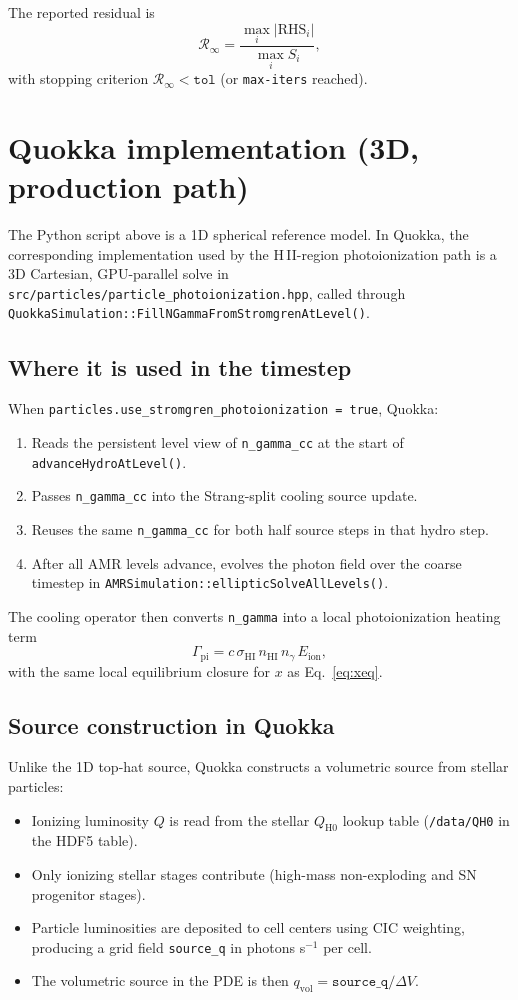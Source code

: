 \documentclass[11pt]{article}
\begin{document}
The reported residual is
\begin{equation}
\mathcal{R}_{\infty} = \frac{\max_i |\mathrm{RHS}_i|}{\max_i S_i},
\end{equation}
with stopping criterion $\mathcal{R}_{\infty}<\texttt{tol}$ (or \texttt{max-iters} reached).

\section{Quokka implementation (3D, production path)}
The Python script above is a 1D spherical reference model. In Quokka, the corresponding implementation used by the H\,II-region photoionization path is a 3D Cartesian, GPU-parallel solve in
\texttt{src/particles/particle\_photoionization.hpp}, called through
\texttt{QuokkaSimulation::FillNGammaFromStromgrenAtLevel()}.

\subsection*{Where it is used in the timestep}
When \texttt{particles.use\_stromgren\_photoionization = true}, Quokka:
\begin{enumerate}
\item Reads the persistent level view of \texttt{n\_gamma\_cc} at the start of \texttt{advanceHydroAtLevel()}.
\item Passes \texttt{n\_gamma\_cc} into the Strang-split cooling source update.
\item Reuses the same \texttt{n\_gamma\_cc} for both half source steps in that hydro step.
\item After all AMR levels advance, evolves the photon field over the coarse timestep in
\texttt{AMRSimulation::ellipticSolveAllLevels()}.
\end{enumerate}
The cooling operator then converts \texttt{n\_gamma} into a local photoionization heating term
\[
\Gamma_{\mathrm{pi}} = c\,\sigma_{\mathrm{HI}}\,n_{\mathrm{HI}}\,n_\gamma\,E_{\mathrm{ion}},
\]
with the same local equilibrium closure for $x$ as Eq.~\eqref{eq:xeq}.

\subsection*{Source construction in Quokka}
Unlike the 1D top-hat source, Quokka constructs a volumetric source from stellar particles:
\begin{itemize}
\item Ionizing luminosity $Q$ is read from the stellar $Q_{\mathrm{H0}}$ lookup table (\texttt{/data/QH0} in the HDF5 table).
\item Only ionizing stellar stages contribute (high-mass non-exploding and SN progenitor stages).
\item Particle luminosities are deposited to cell centers using CIC weighting, producing a grid field \texttt{source\_q} in photons s$^{-1}$ per cell.
\item The volumetric source in the PDE is then $q_{\mathrm{vol}} = \texttt{source\_q}/\Delta V$.
\end{itemize}
\end{document}

